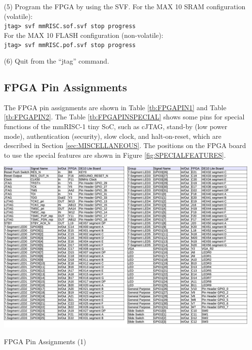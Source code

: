 (5) Program the FPGA by using the SVF. For the MAX 10 SRAM configuration (volatile):\\
\texttt{jtag> svf mmRISC.sof.svf stop progress}\\
For the MAX 10 FLASH configuration (non-volatile):\\
\texttt{jtag> svf mmRISC.pof.svf stop progress}

(6) Quit from the “jtag” command.


\subsection{FPGA Pin Assignments}

The FPGA pin assignments are shown in Table \ref{tb:FPGAPIN1} and Table \ref{tb:FPGAPIN2}. The Table \ref{tb:FPGAPINSPECIAL} shows some pins for special functions of the mmRISC-1 tiny SoC, such as cJTAG, stand-by (low power mode), authentication (security), slow clock, and halt-on-reset, which are described in Section \ref{sec:MISCELLANEOUS}. The positions on the FPGA board to use the special features are shown in Figure \ref{fig:SPECIALFEATURES}.


\begin{table}[H]
    \includegraphics[width=1.0\columnwidth]{./Table/FPGAPinAssign1.png}
    \caption{FPGA Pin Assignments (1)}
    \label{tb:FPGAPIN1}
\end{table}

